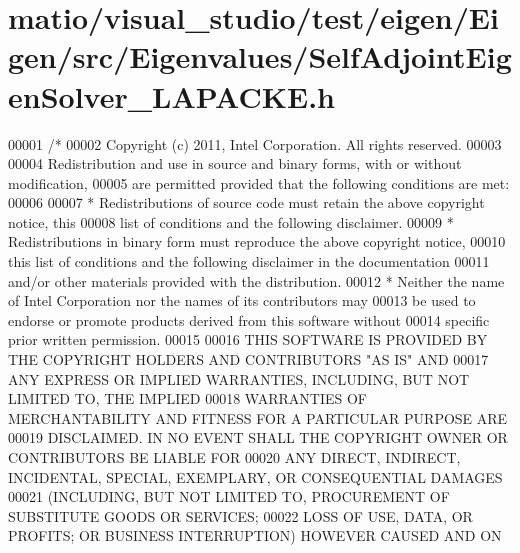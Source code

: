 \hypertarget{matio_2visual__studio_2test_2eigen_2_eigen_2src_2_eigenvalues_2_self_adjoint_eigen_solver___l_a_p_a_c_k_e_8h_source}{}\section{matio/visual\+\_\+studio/test/eigen/\+Eigen/src/\+Eigenvalues/\+Self\+Adjoint\+Eigen\+Solver\+\_\+\+L\+A\+P\+A\+C\+KE.h}
\label{matio_2visual__studio_2test_2eigen_2_eigen_2src_2_eigenvalues_2_self_adjoint_eigen_solver___l_a_p_a_c_k_e_8h_source}

\begin{DoxyCode}
00001 \textcolor{comment}{/*}
00002 \textcolor{comment}{ Copyright (c) 2011, Intel Corporation. All rights reserved.}
00003 \textcolor{comment}{}
00004 \textcolor{comment}{ Redistribution and use in source and binary forms, with or without modification,}
00005 \textcolor{comment}{ are permitted provided that the following conditions are met:}
00006 \textcolor{comment}{}
00007 \textcolor{comment}{ * Redistributions of source code must retain the above copyright notice, this}
00008 \textcolor{comment}{   list of conditions and the following disclaimer.}
00009 \textcolor{comment}{ * Redistributions in binary form must reproduce the above copyright notice,}
00010 \textcolor{comment}{   this list of conditions and the following disclaimer in the documentation}
00011 \textcolor{comment}{   and/or other materials provided with the distribution.}
00012 \textcolor{comment}{ * Neither the name of Intel Corporation nor the names of its contributors may}
00013 \textcolor{comment}{   be used to endorse or promote products derived from this software without}
00014 \textcolor{comment}{   specific prior written permission.}
00015 \textcolor{comment}{}
00016 \textcolor{comment}{ THIS SOFTWARE IS PROVIDED BY THE COPYRIGHT HOLDERS AND CONTRIBUTORS "AS IS" AND}
00017 \textcolor{comment}{ ANY EXPRESS OR IMPLIED WARRANTIES, INCLUDING, BUT NOT LIMITED TO, THE IMPLIED}
00018 \textcolor{comment}{ WARRANTIES OF MERCHANTABILITY AND FITNESS FOR A PARTICULAR PURPOSE ARE}
00019 \textcolor{comment}{ DISCLAIMED. IN NO EVENT SHALL THE COPYRIGHT OWNER OR CONTRIBUTORS BE LIABLE FOR}
00020 \textcolor{comment}{ ANY DIRECT, INDIRECT, INCIDENTAL, SPECIAL, EXEMPLARY, OR CONSEQUENTIAL DAMAGES}
00021 \textcolor{comment}{ (INCLUDING, BUT NOT LIMITED TO, PROCUREMENT OF SUBSTITUTE GOODS OR SERVICES;}
00022 \textcolor{comment}{ LOSS OF USE, DATA, OR PROFITS; OR BUSINESS INTERRUPTION) HOWEVER CAUSED AND ON}

\end{DoxyCode}
